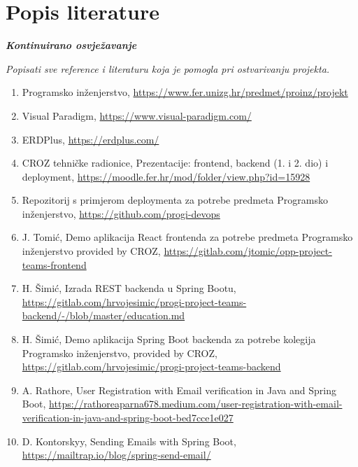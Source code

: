 \chapter*{Popis literature}
	 	
 		\textbf{\textit{Kontinuirano osvježavanje}}
	
		\textit{Popisati sve reference i literaturu koja je pomogla pri ostvarivanju projekta.}
		
		
		\begin{enumerate}
			

			\item Programsko inženjerstvo, \url{https://www.fer.unizg.hr/predmet/proinz/projekt}
			
			\item Visual Paradigm, \url{https://www.visual-paradigm.com/}
			
			\item ERDPlus, \url{https://erdplus.com/}
			
			\item CROZ tehničke radionice, Prezentacije: frontend, backend (1. i 2. dio) i deployment, \url{https://moodle.fer.hr/mod/folder/view.php?id=15928}
			
			\item Repozitorij s primjerom deploymenta za potrebe predmeta Programsko inženjerstvo, \url{https://github.com/progi-devops}
			
			\item J. Tomić, Demo aplikacija React frontenda za potrebe predmeta Programsko inženjerstvo provided by CROZ, 
			\url{https://gitlab.com/jtomic/opp-project-teams-frontend}
			
			\item H. Šimić, Izrada REST backenda u Spring Bootu, \url{https://gitlab.com/hrvojesimic/progi-project-teams-backend/-/blob/master/education.md}
			
			\item H. Šimić, Demo aplikacija Spring Boot backenda za potrebe kolegija Programsko inženjerstvo, provided by CROZ, \url{https://gitlab.com/hrvojesimic/progi-project-teams-backend}
			
			\item A. Rathore, User Registration with Email verification in Java and Spring Boot, \url{https://rathoreaparna678.medium.com/user-registration-with-email-verification-in-java-and-spring-boot-bed7cce1e027}
			
			\item  D. Kontorskyy, Sending Emails with Spring Boot, 	\url{https://mailtrap.io/blog/spring-send-email/}
			

\end{enumerate}
